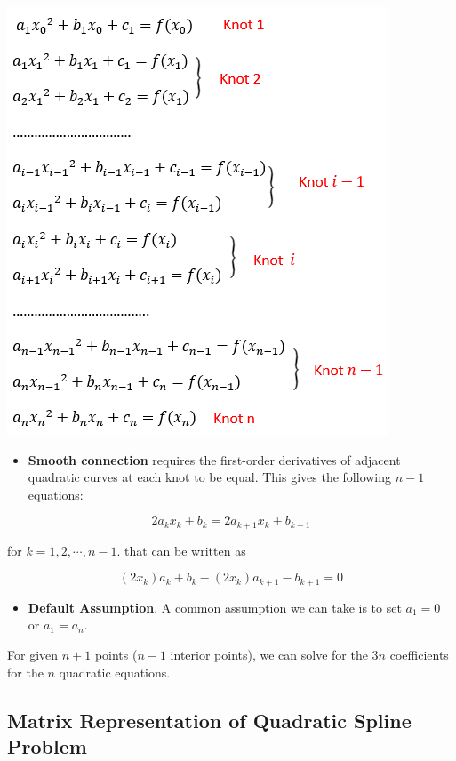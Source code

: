 \documentclass[
]{book}
\providecommand{\tightlist}{%
  \setlength{\itemsep}{0pt}\setlength{\parskip}{0pt}}
\begin{document}
\begin{center}\includegraphics[width=0.6\linewidth]{img10/09-quadraticSplineConnectionEquation} \end{center}

\begin{itemize}
\tightlist
\item
  \textbf{Smooth connection} requires the first-order derivatives of adjacent quadratic curves at each knot to be equal. This gives the following \(n-1\) equations:
\end{itemize}

\[
2a_kx_k + b_k = 2a_{k+1}x_k + b_{k+1}
\]

for \(k=1,2,\cdots, n-1.\) that can be written as

\[
(2x_k)a_k + b_k -(2x_k)a_{k+1} - b_{k+1} = 0
\]

\begin{itemize}
\tightlist
\item
  \textbf{Default Assumption}. A common assumption we can take is to set \(a_1 = 0\) or \(a_1 = a_n\).
\end{itemize}

For given \(n+1\) points (\(n-1\) interior points), we can solve for the \(3n\) coefficients for the \(n\) quadratic equations.

\hfill\break

\hypertarget{matrix-representation-of-quadratic-spline-problem}{%
\subsection{Matrix Representation of Quadratic Spline Problem}\label{matrix-representation-of-quadratic-spline-problem}}
\end{document}
